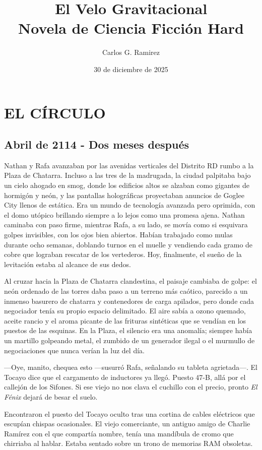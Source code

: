 \documentclass[12pt,a4paper]{book}
\title{\textbf{El Velo Gravitacional}\\[0.5cm]\large Novela de Ciencia Ficción Hard}
\author{Carlos G. Ramirez}
\date{30 de diciembre de 2025}
\begin{document}
\maketitle
\frontmatter
\tableofcontents
\newpage
\mainmatter

\chapter{EL CÍRCULO}

\section*{Abril de 2114 - Dos meses después}

Nathan y Rafa avanzaban por las avenidas verticales del Distrito RD rumbo a la Plaza de Chatarra. Incluso a las tres de la madrugada, la ciudad palpitaba bajo un cielo ahogado en smog, donde los edificios altos se alzaban como gigantes de hormigón y neón, y las pantallas holográficas proyectaban anuncios de Goglee City llenos de estática. Era un mundo de tecnología avanzada pero oprimida, con el domo utópico brillando siempre a lo lejos como una promesa ajena. Nathan caminaba con paso firme, mientras Rafa, a su lado, se movía como si esquivara golpes invisibles, con los ojos bien abiertos. Habían trabajado como mulas durante ocho semanas, doblando turnos en el muelle y vendiendo cada gramo de cobre que lograban rescatar de los vertederos. Hoy, finalmente, el sueño de la levitación estaba al alcance de sus dedos.

Al cruzar hacia la Plaza de Chatarra clandestina, el paisaje cambiaba de golpe: el neón ordenado de las torres daba paso a un terreno más caótico, parecido a un inmenso basurero de chatarra y contenedores de carga apilados, pero donde cada negociador tenía su propio espacio delimitado. El aire sabía a ozono quemado, aceite rancio y el aroma picante de las frituras sintéticas que se vendían en los puestos de las esquinas. En la Plaza, el silencio era una anomalía; siempre había un martillo golpeando metal, el zumbido de un generador ilegal o el murmullo de negociaciones que nunca verían la luz del día.

---Oye, manito, chequea esto ---susurró Rafa, señalando su tableta agrietada---. El Tocayo dice que el cargamento de inductores ya llegó. Puesto 47-B, allá por el callejón de los Sifones. Si ese viejo no nos clava el cuchillo con el precio, pronto \textit{El Fénix} dejará de besar el suelo.

Encontraron el puesto del Tocayo oculto tras una cortina de cables eléctricos que escupían chispas ocasionales. El viejo comerciante, un antiguo amigo de Charlie Ramírez con el que compartía nombre, tenía una mandíbula de cromo que chirriaba al hablar. Estaba sentado sobre un trono de memorias RAM obsoletas.
\end{document}
